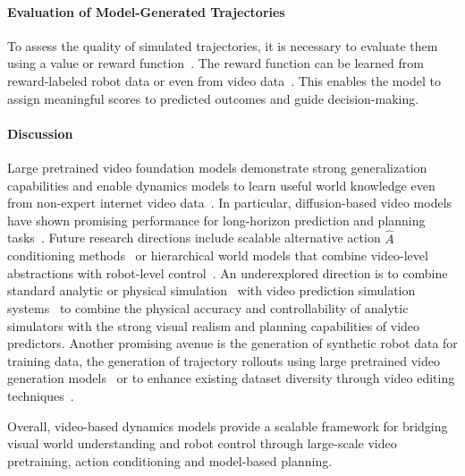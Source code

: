 \paragraph{Evaluation of Model-Generated Trajectories}
To assess the quality of simulated trajectories, it is necessary to evaluate them using a value or reward function~\cite{Seo2022ReinforcementLW}. The reward function can be learned from reward-labeled robot data or even from video data~\cite{Mendonca2023StructuredWM, Rybkin2018LearningWY, Yang2023LearningIR, Du2023VideoLP}. This enables the model to assign meaningful scores to predicted outcomes and guide decision-making.


\paragraph{Discussion}
Large pretrained video foundation models demonstrate strong generalization capabilities and enable dynamics models to learn useful world knowledge even from non-expert internet video data~\cite{Yu2020MOPOMO}. In particular, diffusion-based video models have shown promising performance for long-horizon prediction and planning tasks~\cite{Du2023VideoLP, Yang2023LearningIR}.
Future research directions include scalable alternative action $\hat{A}$ conditioning methods~\cite{Bruce2024GenieGI} or hierarchical world models that combine video-level abstractions with robot-level control~\cite{LeCun2022APT}. %
An underexplored direction is to combine standard analytic or physical simulation~\cite{Gao2026NVIDIAIS} with video prediction simulation systems~\cite{Yang2023LearningIR} to combine the physical accuracy and controllability of analytic simulators with the strong visual realism and planning capabilities of video predictors. Another promising avenue is the generation of synthetic robot data for training data, the generation of trajectory rollouts using large pretrained video generation models~\cite{Yang2023LearningIR, Bruce2024GenieGI} or to enhance existing dataset diversity through video editing techniques~\cite{Yu2023ScalingRL}. 


Overall, video-based dynamics models provide a scalable framework for bridging visual world understanding and robot control through large-scale video pretraining, action conditioning and model-based planning.

